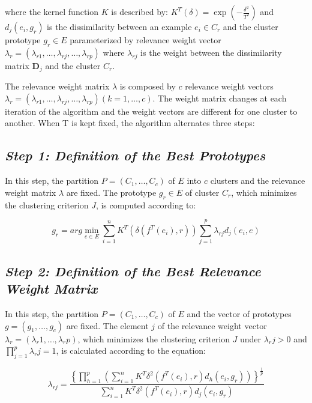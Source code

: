 \documentclass[10pt, conference, compsocconf]{IEEEtran}
\begin{document}
\noindent where the kernel function $K$ is described by: $K^T(\delta) = \exp (-\frac{\delta ^2}{T^2})$ and $d_j(e_i, g_r)$ is the dissimilarity between an example $e_i \in C_r$ and the cluster prototype $g_r \in E$ parameterized by relevance weight vector $\lambda_{r} = (\lambda_{r1}, \dots, \lambda_{rj}, \dots, \lambda_{rp})$ where $\lambda_{rj}$ is the weight between the dissimilarity matrix $\textbf{D}_j$ and the cluster $C_r$. 

The relevance weight matrix $\lambda$ is composed by $c$ relevance weight vectors $\lambda_r = (\lambda_{r1},\dots,\lambda_{rj},\dots,\lambda_{rp}) (k = 1,\dots, c)$. The weight matrix changes at each iteration of the algorithm and the weight vectors are different for one cluster to another. When T is kept fixed, the algorithm alternates three steps:

\subsection*{\textbf{\textit{Step 1: Definition of the Best Prototypes}}}

In this step, the partition $P = (C_1,\dots, C_c)$ of $E$ into $c$ clusters and the relevance weight matrix $\lambda$ are fixed. The prototype $g_r \in E$ of cluster $C_r$, which minimizes the clustering criterion $J$, is computed according to:

\begin{equation}
g_r = arg \min_{e \in E} \sum_{i=1}^n K^T (\delta(f^T(e_i),r)) \sum_{j=1}^p \lambda_{rj} d_j(e_i, e)
\label{prototipo}
\end{equation}

\subsection*{\textbf{\textit{Step 2: Definition of the Best Relevance Weight Matrix}}}

In this step, the partition $P = (C_1,\dots, C_c)$ of $E$ and the vector of prototypes $g = (g_1, \dots, g_c)$ are fixed. The element $j$ of the relevance weight vector $\lambda_r = (\lambda_r1, \dots, \lambda_rp)$, which minimizes the clustering criterion $J$ under $\lambda_rj > 0$ and $\prod_{j=1}^p \lambda_rj = 1$, is calculated according to the equation:

\begin{equation}
\lambda_{rj} = \frac{\left\lbrace  \prod_{h=1}^p ( \sum_{i=1}^n K^T \delta^2(f^T(e_i), r) d_h(e_i,g_r)) \right\rbrace  ^ \frac{1}{p} }{\sum_{i=1}^n K^T \delta^2(f^T(e_i), r) d_j(e_i,g_r)}
\label{pesos}
\end{equation}
\end{document}
